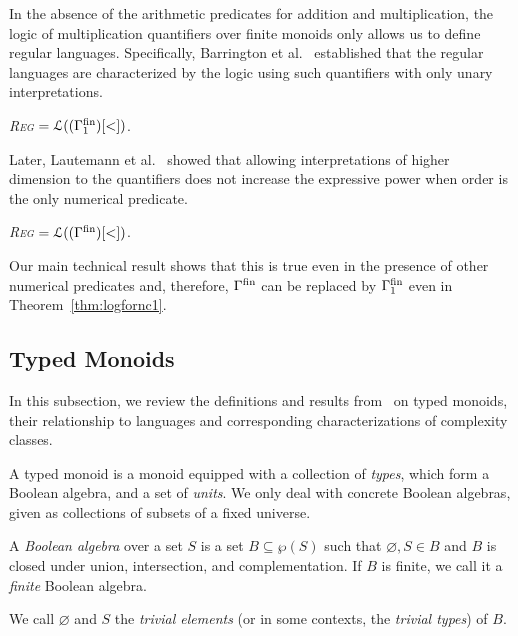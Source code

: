 \documentclass[a4paper,UKenglish,cleveref, autoref, thm-restate, anonymous]{lipics-v2021}
\begin{document}
In the absence of the arithmetic predicates for addition and multiplication, the logic of multiplication quantifiers over finite monoids only allows us to define regular languages.  Specifically, Barrington et al.~\cite{barrington1990uniformity} established that the regular languages are characterized by the logic using such quantifiers with only unary interpretations.
\begin{theorem}\label{thm:fologforreg}
    \emph{\textsc{Reg}} $= \mathcal{L}((\Gamma^{\mathrm{fin}}_1)[<])$.
\end{theorem}
\noindent Later, Lautemann et al.~\cite[Theorem 5.1]{lautemann2001descriptive} showed that allowing interpretations of higher dimension to the quantifiers does not increase the expressive power when order is the only numerical predicate.
\begin{theorem}\label{thm:unaryfologforreg}
    \emph{\textsc{Reg}} $= \mathcal{L}((\Gamma^{\mathrm{fin}})[<])$.
  \end{theorem}

Our main technical result shows that this is true even in the presence of other numerical predicates and, therefore, $\Gamma^{\mathrm{fin}}$ can be replaced by $\Gamma^{\mathrm{fin}}_1$ even in Theorem~\ref{thm:logfornc1}.  


\subsection{Typed Monoids}\label{sec:backgroundtyped}

In this subsection, we review the definitions and results from~\cite{behle2011typed,krebs2008typed} on typed monoids, their relationship to languages and corresponding characterizations of complexity classes.

A typed monoid is a monoid equipped with a collection of \emph{types}, which form a Boolean algebra, and a set of \emph{units}.  We only deal with concrete Boolean algebras, given as collections of subsets of a fixed universe.

\begin{definition}
    A \emph{Boolean algebra} over a set $S$ is a set $B \subseteq \wp(S)$ such that $\varnothing, S \in B$ and $B$ is closed under union, intersection, and complementation. If $B$ is finite, we call it a \emph{finite} Boolean algebra.

    We call $\varnothing$ and $S$ the \emph{trivial elements} (or in some contexts, the \emph{trivial types}) of $B$.
\end{definition}
\end{document}

